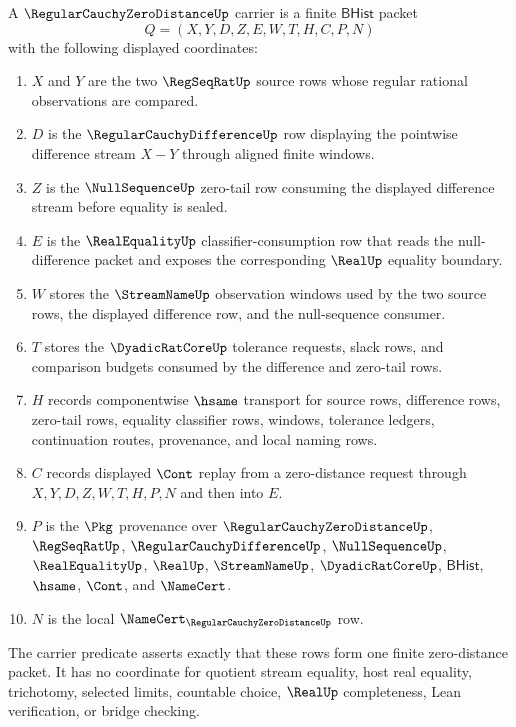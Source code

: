 \begin{definition}
\label{def:regular-cauchy-zero-distance-carrier}
A $\RegularCauchyZeroDistanceUp$ carrier is a finite $\mathsf{BHist}$ packet
$$
Q=(X,Y,D,Z,E,W,T,H,C,P,N)
$$
with the following displayed coordinates:
\begin{enumerate}
\item $X$ and $Y$ are the two $\RegSeqRatUp$ source rows whose regular rational observations are compared.
\item $D$ is the $\RegularCauchyDifferenceUp$ row displaying the pointwise difference stream $X-Y$ through aligned finite windows.
\item $Z$ is the $\NullSequenceUp$ zero-tail row consuming the displayed difference stream before equality is sealed.
\item $E$ is the $\RealEqualityUp$ classifier-consumption row that reads the null-difference packet and exposes the corresponding $\RealUp$ equality boundary.
\item $W$ stores the $\StreamNameUp$ observation windows used by the two source rows, the displayed difference row, and the null-sequence consumer.
\item $T$ stores the $\DyadicRatCoreUp$ tolerance requests, slack rows, and comparison budgets consumed by the difference and zero-tail rows.
\item $H$ records componentwise $\hsame$ transport for source rows, difference rows, zero-tail rows, equality classifier rows, windows, tolerance ledgers, continuation routes, provenance, and local naming rows.
\item $C$ records displayed $\Cont$ replay from a zero-distance request through $X,Y,D,Z,W,T,H,P,N$ and then into $E$.
\item $P$ is the $\Pkg$ provenance over $\RegularCauchyZeroDistanceUp$, $\RegSeqRatUp$, $\RegularCauchyDifferenceUp$, $\NullSequenceUp$, $\RealEqualityUp$, $\RealUp$, $\StreamNameUp$, $\DyadicRatCoreUp$, $\mathsf{BHist}$, $\hsame$, $\Cont$, and $\NameCert$.
\item $N$ is the local $\NameCert_{\RegularCauchyZeroDistanceUp}$ row.
\end{enumerate}
The carrier predicate asserts exactly that these rows form one finite zero-distance packet. It has no coordinate for quotient stream equality, host real equality, trichotomy, selected limits, countable choice, $\RealUp$ completeness, Lean verification, or bridge checking.
\end{definition}

